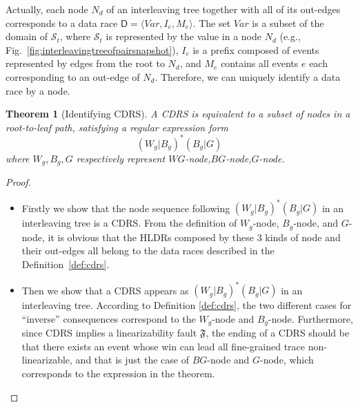 \documentclass[runningheads]{llncs}
\newcommand{\pair}[1]{{\langle{#1}\rangle}}
\newcommand{\se}{\mathit{I_e}}
\newcommand{\ce}{\mathit{M_e}}
\newtheorem{myTheo}{Theorem}
\begin{document}
Actually, each node $N_d$ of an interleaving tree together with all of its out-edges corresponds to a data race $\mathsf{D} = \pair{\mathit{Var}, \se,\ce}$. The set $\mathit{Var}$ is a subset of the domain of $\mathcal{S}_t$, where $\mathcal{S}_t$ is represented by the value in a node $N_d$ (e.g., Fig.~\ref{fig:interleavingtreeofpairsnapshot}), $\se$ is a prefix composed of events represented by edges from the root to $N_d$, and $\ce$ contains all events $e$ each corresponding to an out-edge of $N_d$. Therefore, we can uniquely identify a data race by a node.

\begin{myTheo}[Identifying CDRS]\label{theo:idenfycdrs}
    A CDRS is equivalent to a subset of nodes in a root-to-leaf path, satisfying a regular expression form
    $$(W_g|B_g)^*(B_g|G)$$
    where $W_g,B_g,G$ respectively represent $\mathit{WG}$-node,$\mathit{BG}$-node,$\mathit{G}$-node.
\end{myTheo}





\begin{proof}



\begin{itemize}
\item Firstly we show that the node sequence following $(W_g|B_g)^*(B_g|G)$ in an interleaving tree is a CDRS.
From the definition of $W_g$-node, $B_g$-node, and $G$-node, it is obvious that the HLDRs composed by these 3 kinds of node and their out-edges all belong to the
data races described in the Definition~\ref{def:cdrs}.

\item Then we show that a CDRS appears as $(W_g|B_g)^*(B_g|G)$ in an interleaving tree.
According to Definition \ref{def:cdrs}, the two different cases for ``inverse'' consequences correspond to 
the $W_g$-node and $B_g$-node. Furthermore, since CDRS implies a linearizability fault $\mathfrak{F}$, the ending of a CDRS 
should be that there exists an event whose win can lead all fine-grained trace non-linearizable, and that is just the case of $BG$-node 
and $G$-node, which corresponds to the expression in the theorem.
\end{itemize}
 
 \end{proof}
\end{document}
